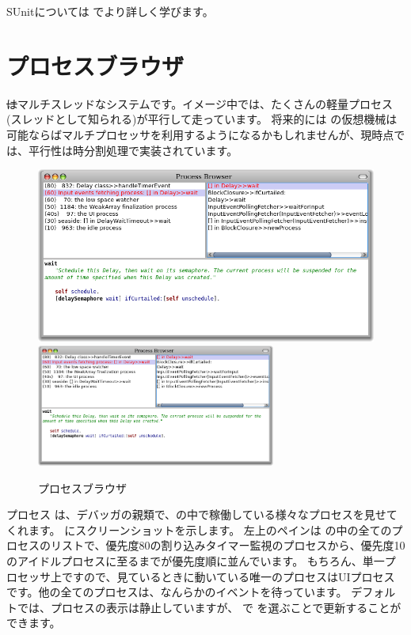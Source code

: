 \documentclass[a4paper,10pt,twoside]{book}
\begin{document}
SUnitについては  でより詳しく学びます。


\section{プロセスブラウザ}

\st はマルチスレッドなシステムです。イメージ中では、たくさんの軽量プロセス(スレッドとして知られる)が平行して走っています。
将来的には \pharo の仮想機械は可能ならばマルチプロセッサを利用するようになるかもしれませんが、現時点では、平行性は時分割処理で実装されています。

\begin{figure}[btp]
\begin{center}
\ifluluelse
{\includegraphics[width=\textwidth]{processBrowser}}
{\includegraphics[width=0.7\textwidth]{processBrowser}}
\end{center}
\caption{プロセスブラウザ}
\end{figure}

プロセス  は、デバッガの親類で、\pharo の中で稼働している様々なプロセスを見せてくれます。
 にスクリーンショットを示します。
左上のペインは \pharo の中の全てのプロセスのリストで、優先度80の割り込みタイマー監視のプロセスから、優先度10のアイドルプロセスに至るまでが優先度順に並んでいます。
もちろん、単一プロセッサ上ですので、見ているときに動いている唯一のプロセスはUIプロセスです。他の全てのプロセスは、なんらかのイベントを待っています。
デフォルトでは、プロセスの表示は静止していますが、 で  を選ぶことで更新することができます。
\end{document}
